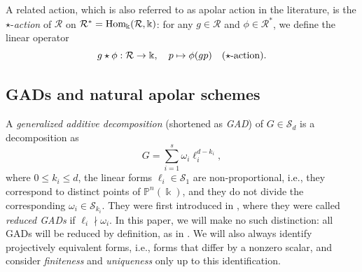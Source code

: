 \documentclass{amsart}
\theoremstyle{plain}
\renewcommand{\k}{\Bbbk}
\renewcommand{\S}{\mathcal{S}}
\newcommand{\Hom}{\textnormal{Hom}}
\renewcommand{\P}{\mathbb{P}}
\def\P{{\mathbb{P}}}
\def\R{\mathcal{R}}
\numberwithin{equation}{section}
\begin{document}
A related action, which is also referred to as apolar action in the literature, is the $\star$-\emph{action} of $\R$ on $\R^* = \Hom_{\k}(\R,\k)$: for any $g \in \R$ and $\phi \in \R^*$, we define the linear operator
\[ g \star \phi: \R \to \k, \quad p \mapsto \phi(gp) \quad \textnormal{($\star$-action)}. \]

\subsection{GADs and natural apolar schemes} \label{sec:GADsplus}

A \emph{generalized additive decomposition} (shortened as \emph{GAD}) of $G \in \S_d$ is a decomposition as
\begin{equation} \label{eq:GAD}
    G = \sum_{i=1}^s \omega_i \ell_i^{d-k_i},
\end{equation} 
where $0\leq k_i\leq d$, the linear forms $\ell_i\in \S_1$ are non-proportional, i.e., they correspond to distinct points of $\P^n(\k)$, and they do not divide the corresponding $\omega_i \in \S_{k_i}$.
They were first introduced in \cite[Def. 1.30]{IK99}, where they were called \emph{reduced GADs} if $\ell_i \nmid \omega_i$. In this paper, we will make no such distinction: all GADs will be reduced by definition, as in \cite{BOT24}.
We will also always identify projectively equivalent forms, i.e., forms that differ by a nonzero scalar, and consider \emph{finiteness} and \emph{uniqueness} only up to this identification.
\end{document}
